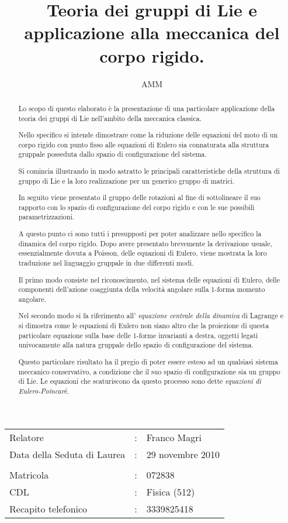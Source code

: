 \documentclass[11pt]{article}
\title{Teoria dei gruppi di Lie e applicazione alla meccanica del corpo rigido.}
\author{AMM}
\date{}
\begin{document}
\maketitle

\begin{center}
\begin{tabular}{l c l}
Relatore & : & Franco Magri \\
Data della Seduta di Laurea & : & 29 novembre 2010 \\
\\
Matricola & : & 072838 \\
CDL & : & Fisica (512) \\
Recapito telefonico & : & 3339825418 \\
\end{tabular}

\end{center}



\begin{abstract}
Lo scopo di questo elaborato è la presentazione di una particolare applicazione della teoria dei gruppi di Lie nell'ambito della meccanica classica.

Nello specifico si intende dimostrare come la riduzione delle equazioni del moto di un corpo rigido con punto fisso alle equazioni di Eulero sia connaturata alla struttura gruppale posseduta dallo spazio di configurazione del sistema.

Si comincia illustrando in modo astratto le principali caratteristiche della struttura di gruppo di Lie e la loro realizzazione per un generico gruppo di matrici.

In seguito viene presentato il gruppo delle rotazioni al fine di sottolineare il suo rapporto con lo spazio di configurazione del corpo rigido e con le sue possibili parametrizzazioni.

A questo punto ci sono tutti i presupposti per poter analizzare nello specifico la dinamica del corpo rigido. Dopo avere presentato brevemente la derivazione usuale, essenzialmente dovuta a Poisson, delle equazioni di Eulero, viene mostrata la loro traduzione nel linguaggio gruppale in due differenti modi.

Il primo modo consiste nel riconoscimento, nel sistema delle equazioni di Eulero, delle componenti dell'azione coaggiunta della velocità angolare sulla 1-forma momento angolare.

Nel secondo modo si fa riferimento all' \emph{equazione centrale della dinamica} di Lagrange e si dimostra come le equazioni di Eulero non siano altro che la proiezione di questa particolare equazione sulla base delle 1-forme invarianti a destra, oggetti legati univocamente alla natura gruppale dello spazio di configurazione del sistema.

Questo particolare risultato ha il pregio di poter essere esteso ad un qualsiasi sistema meccanico conservativo, a condizione che il suo spazio di configurazione sia un gruppo di Lie. Le equazioni che scaturiscono da questo processo sono dette \emph{equazioni di Eulero-Poincarè}.
\end{abstract}
\end{document}
